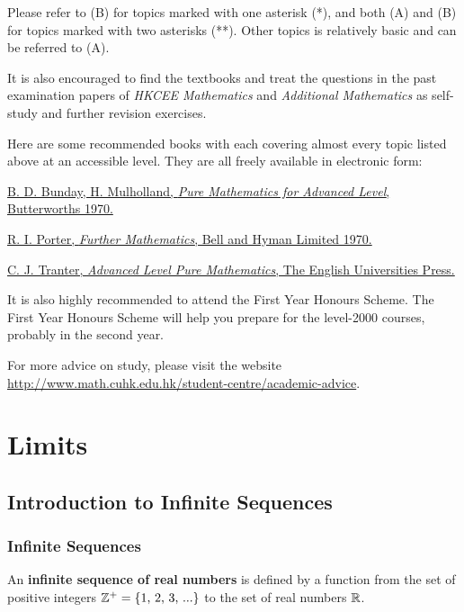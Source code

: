 \documentclass[a4paper,12pt]{article}
\begin{document}
Please refer to (B) for topics marked with one asterisk (*), and both (A) and (B) for topics marked with two asterisks (**). Other topics is relatively basic and can be referred to (A).\n

It is also encouraged to find the textbooks and treat the questions in the past examination papers of \textit{HKCEE Mathematics} and \textit{Additional Mathematics} as self-study and further revision exercises.\n

Here are some recommended books with each covering almost every topic listed above at an accessible level. They are all freely available in electronic form:
\begin{rlist}
  \item \href{https://archive.org/details/PureMathematicsForAdvancedLevel}{B. D. Bunday, H. Mulholland, \textit{Pure Mathematics for Advanced Level}, Butterworths 1970.}
  \item \href{https://archive.org/details/FurtherMathematics}{R. I. Porter, \textit{Further Mathematics}, Bell and Hyman Limited 1970.}
  \item \href{https://archive.org/details/in.ernet.dli.2015.285850}{C. J. Tranter, \textit{Advanced Level Pure Mathematics}, The English Universities Press.}
\end{rlist}

It is also highly recommended to attend the First Year Honours Scheme. The First Year Honours Scheme will help you prepare for the level-2000 courses, probably in the second year.\n

For more advice on study, please visit the website \url{http://www.math.cuhk.edu.hk/student-centre/academic-advice}.
\pagebreak

\section{Limits}
\subsection{Introduction to Infinite Sequences}
\subsubsection{Infinite Sequences}
\begin{dft}
  An \textbf{infinite sequence of real numbers} is defined by a function from the set of positive integers $\mathbb{Z}^{+}=\left\{ 1\text{, }2\text{, }3\text{, ...} \right\}$ to the set of real numbers $\mathbb{R}$.
\end{dft}
\end{document}
